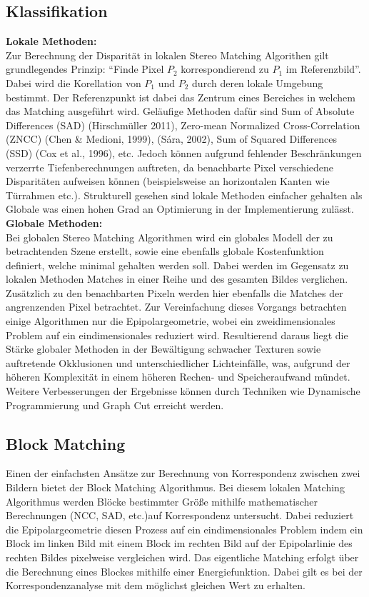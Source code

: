 \subsection{Klassifikation}
\label{subsec:stereo_matching_classification}
\textbf{Lokale Methoden:}\\
Zur Berechnung der Disparität in lokalen Stereo Matching Algorithen gilt grundlegendes Prinzip: “Finde Pixel $P_2$ korrespondierend zu $P_1$ im Referenzbild”. Dabei wird die Korellation von $P_1$ und $P_2$ durch deren lokale Umgebung bestimmt. Der Referenzpunkt ist dabei das Zentrum eines Bereiches in welchem das Matching ausgeführt wird. Geläufige Methoden dafür sind Sum of Absolute Differences (SAD) (Hirschmüller 2011), Zero-mean Normalized Cross-Correlation (ZNCC) (Chen \& Medioni, 1999), (Sára, 2002), Sum of Squared Differences (SSD) (Cox et al., 1996), etc.
Jedoch können aufgrund fehlender Beschränkungen verzerrte Tiefenberechnungen auftreten, da benachbarte Pixel verschiedene Disparitäten aufweisen können (beispielsweise an horizontalen Kanten wie Türrahmen etc.). Strukturell gesehen sind lokale Methoden einfacher gehalten als Globale was einen hohen Grad an Optimierung in der Implementierung zulässt.\\

\noindent
\textbf{Globale Methoden:}\\
Bei globalen Stereo Matching Algorithmen wird ein globales Modell der zu betrachtenden Szene erstellt, sowie eine ebenfalls globale Kostenfunktion definiert, welche minimal gehalten werden soll. Dabei werden im Gegensatz zu lokalen Methoden Matches in einer Reihe und des gesamten Bildes verglichen. Zusätzlich zu den benachbarten Pixeln werden hier ebenfalls die Matches der angrenzenden Pixel betrachtet. Zur Vereinfachung dieses Vorgangs betrachten einige Algorithmen nur die Epipolargeometrie, wobei ein zweidimensionales Problem auf ein eindimensionales reduziert wird. Resultierend daraus liegt die Stärke globaler Methoden in der Bewältigung schwacher Texturen sowie auftretende Okklusionen und unterschiedlicher Lichteinfälle, was, aufgrund der höheren Komplexität in einem höheren Rechen- und Speicheraufwand mündet. Weitere Verbesserungen der Ergebnisse können durch Techniken wie Dynamische Programmierung und Graph Cut erreicht werden.

\subsection{Block Matching}
\label{subsec:stereo_matching_bm}
Einen der einfachsten Ansätze zur Berechnung von Korrespondenz zwischen zwei Bildern bietet der Block Matching Algorithmus. Bei diesem lokalen Matching Algorithmus werden Blöcke bestimmter Größe mithilfe mathematischer Berechnungen (NCC, SAD, etc.)auf Korrespondenz untersucht. Dabei reduziert die Epipolargeometrie diesen Prozess auf ein eindimensionales Problem indem ein Block im linken Bild mit einem Block im rechten Bild auf der Epipolarlinie des rechten Bildes pixelweise vergleichen wird. Das eigentliche Matching erfolgt über die Berechnung eines Blockes mithilfe einer Energiefunktion. Dabei gilt es bei der Korrespondenzanalyse mit dem möglichst gleichen Wert zu erhalten. 

